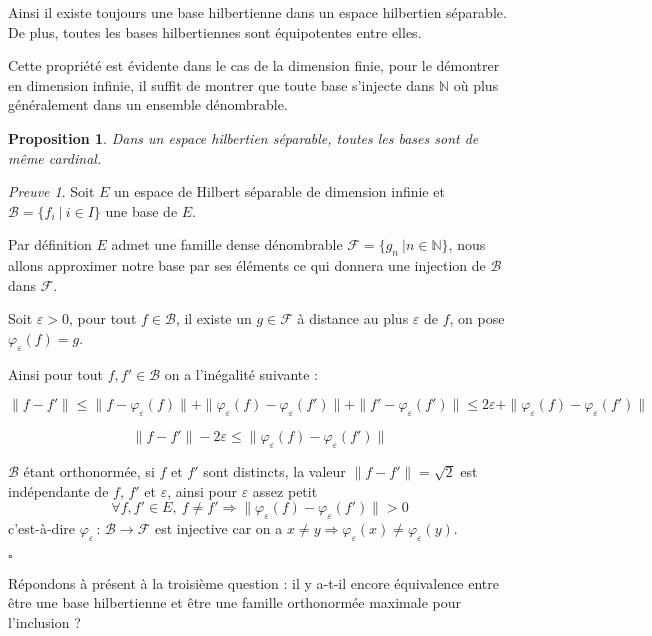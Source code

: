 \documentclass[]{article}
\newtheorem{myproposition}{Proposition}
\theoremstyle{remark}
\newtheorem{myproof}{Preuve}
\theoremstyle{definition}
\newcommand{\cqfd}{
	\hfill$\square$
}
\newcommand{\funcshort}[3]{
	#1 \, : \, #2 \longrightarrow #3
}
\begin{document}
	Ainsi il existe toujours une base hilbertienne dans un espace hilbertien séparable. De plus, toutes les bases hilbertiennes sont équipotentes entre elles.
	
	Cette propriété est évidente dans le cas de la dimension finie, pour le démontrer en dimension infinie, il suffit de montrer que toute base s'injecte dans $\mathbb{N}$ où plus généralement dans un ensemble dénombrable.
	
	\begin{myproposition}
		Dans un espace hilbertien séparable, toutes les bases sont de même cardinal.
	\end{myproposition}
	
	\begin{myproof}
		Soit $E$ un espace de Hilbert séparable de dimension infinie et $\mathcal{B} = \{f_i ~ | ~ i \in I\}$ une base de $E$.
		
		Par définition $E$ admet une famille dense dénombrable $\mathcal{F} = \{g_n ~ | n \in \mathbb{N}\}$, nous allons approximer notre base par ses éléments ce qui donnera une injection de $\mathcal{B}$ dans $\mathcal{F}$.
		
		Soit $\varepsilon > 0$, pour tout $f \in \mathcal{B}$, il existe un $g \in \mathcal{F}$ à distance au plus $\varepsilon$ de $f$, on pose $\varphi_\varepsilon(f) = g$.
		
		Ainsi pour tout $f, f' \in \mathcal{B}$ on a l'inégalité suivante :
		
		$$\|f - f'\| \leqslant \|f - \varphi_\varepsilon(f)\| + \|\varphi_\varepsilon(f) - \varphi_\varepsilon(f')\| + \|f' - \varphi_\varepsilon(f')\| \leqslant 2 \varepsilon + \|\varphi_\varepsilon(f) - \varphi_\varepsilon(f')\|$$
		
		$$\|f - f'\| - 2 \varepsilon \leqslant \|\varphi_\varepsilon(f) - \varphi_\varepsilon(f')\|$$
		
		$\mathcal{B}$ étant orthonormée, si $f$ et $f'$ sont distincts, la valeur $\|f-f'\| = \sqrt{2}$ est indépendante de $f$, $f'$ et $\varepsilon$, ainsi pour $\varepsilon$ assez petit $$\forall f, f' \in E, ~ f \neq f' \Longrightarrow \|\varphi_\varepsilon(f) - \varphi_\varepsilon(f')\| > 0$$ c'est-à-dire $\funcshort{\varphi_\varepsilon}{\mathcal{B}}{\mathcal{F}}$ est injective car on a $x \neq y \Longrightarrow \varphi_\varepsilon(x) \neq \varphi_\varepsilon(y)$.
		
		\cqfd
	\end{myproof}
	
	Répondons à présent à la troisième question : il y a-t-il encore équivalence entre être une base hilbertienne et être une famille orthonormée maximale pour l'inclusion ?
	
\end{document}
